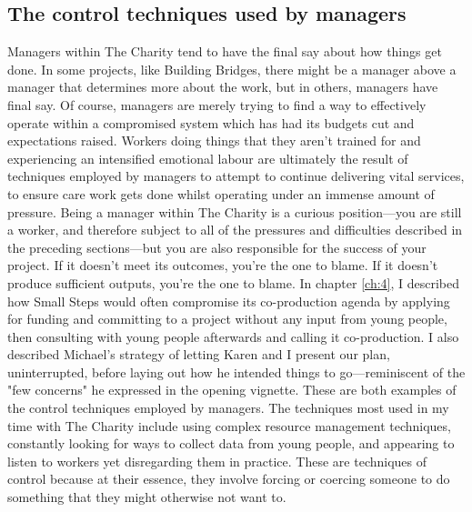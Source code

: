 \subsection{The control techniques used by managers}
Managers within The Charity tend to have the final say about how things get done. In some projects, like Building Bridges, there might be a manager above a manager that determines more about the work, but in others, managers have final say. Of course, managers are merely trying to find a way to effectively operate within a compromised system which has had its budgets cut and expectations raised. Workers doing things that they aren't trained for and experiencing an intensified emotional labour are ultimately the result of techniques employed by managers to attempt to continue delivering vital services, to ensure care work gets done whilst operating under an immense amount of pressure. Being a manager within The Charity is a curious position—you are still a worker, and therefore subject to all of the pressures and difficulties described in the preceding sections—but you are also responsible for the success of your project. If it doesn’t meet its outcomes, you’re the one to blame. If it doesn't produce sufficient outputs, you're the one to blame. In chapter \ref{ch:4}, I described how Small Steps would often compromise its co-production agenda by applying for funding and committing to a project without any input from young people, then consulting with young people afterwards and calling it co-production. I also described Michael’s strategy of letting Karen and I present our plan, uninterrupted, before laying out how he intended things to go—reminiscent of the "few concerns" he expressed in the opening vignette. These are both examples of the control techniques employed by managers. The techniques most used in my time with The Charity include using complex resource management techniques, constantly looking for ways to collect data from young people, and appearing to listen to workers yet disregarding them in practice. These are techniques of control because at their essence, they involve forcing or coercing someone to do something that they might otherwise not want to. 


